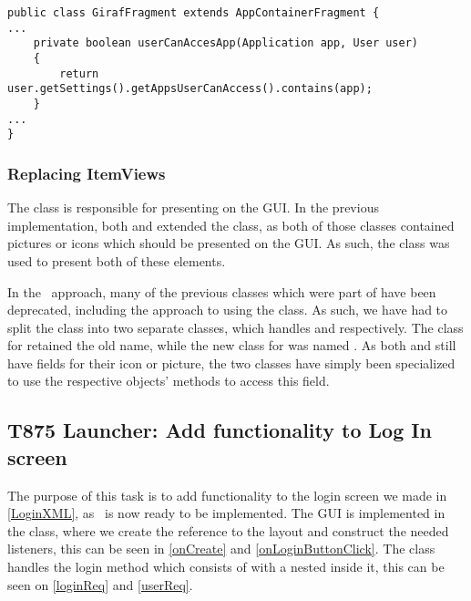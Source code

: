 \begin{minipage}[H]{\linewidth}
\begin{lstlisting}[caption = New method which replaces the functionality of the
\ttt{ProfileApplicationController}, label = ucaa] 
public class GirafFragment extends AppContainerFragment {
...
	private boolean userCanAccesApp(Application app, User user) 
	{
		return user.getSettings().getAppsUserCanAccess().contains(app);
	}
...
}
\end{lstlisting}
\end{minipage}

\subsubsection{Replacing ItemViews}
The  class is responsible for presenting
 on the GUI. In the previous implementation, both 
and  extended the  class, as both of those classes
contained pictures or icons which should be presented on the GUI. As such, the
 class was used to present both of these
elements.\nl

In the \rmlib\ approach, many of the previous classes which were
part of  have been deprecated, including the approach to
using the  class. As such, we have had to split the
 class into two separate classes, which handles
 and  respectively. The class for 
retained the old name, while the new class for  was named
. As both  and  still have
fields for their icon or picture, the two  classes have simply
been specialized to use the respective objects' methods to access this field.

\subsection{T875 Launcher: Add functionality to Log In screen}
The purpose of this task is to add functionality to the login screen we made
in \autoref{LoginXML}, as \rlib\ is now ready to be implemented. The GUI is
implemented in the  class, where we create the reference
to the  layout and construct the needed listeners, this can be seen in
\autoref{onCreate} and \autoref{onLoginButtonClick}. The 
class handles the login method which consists of  with a 
 nested inside it, this can be seen on \autoref{loginReq} and
\autoref{userReq}.\nl 

